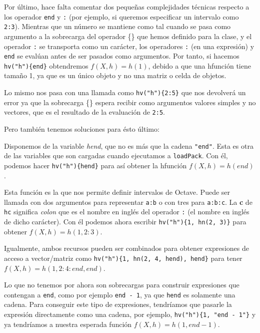 \documentclass{article}
\begin{document}
Por último, hace falta comentar dos pequeñas complejidades técnicas
respecto a los operador \texttt{end} y \texttt{:} (por ejemplo, si
queremos especificar un intervalo como \texttt{2:3}). Mientras que un
número se mantiene como tal cuando se pasa como argumento a la
sobrecarga del operador \{\} que hemos definido para la clase, y el
operador \texttt{:} se transporta como un carácter, los operadores
\texttt{:} (en una expresión) y \texttt{end} se evalúan antes de ser
pasados como argumentos. Por tanto, si hacemos \texttt{hv("h")\{end\}}
obtendremos $f(X, h) = h(1)$, debido a que una hfunción tiene tamaño
1, ya que es un único objeto y no una matriz o celda de objetos.

Lo mismo nos pasa con una llamada como \texttt{hv("h")\{2:5\}} que nos
devolverá un error ya que la sobrecarga \{\} espera recibir como
argumentos valores simples y no vectores, que es el resultado de la
evaluación de \texttt{2:5}.

Pero también tenemos soluciones para ésto último:

\begin{description}[font=\normalfont\ttfamily]
  \item[\texttt{end}] Disponemos de la variable \textit{hend}, que no
    es más que la cadena \texttt{"{}end"}. Esta es otra de las variables
    que son cargadas cuando ejecutamos a \texttt{loadPack}. Con él,
    podemos hacer \texttt{hv("h")\{hend\}} para así obtener la
    hfunción $f(X, h) = h(end)$.
  \item[\texttt{hc(a, b, [c])}] Esta función es la que nos permite
    definir intervalos de Octave. Puede ser llamada con dos argumentos
    para representar \texttt{a:b} o con tres para \texttt{a:b:c}. La
    \textbf{c} de \texttt{hc} significa \textit{colon} que es el
    nombre en inglés del operador \texttt{:} (el nombre en inglés de
    dicho carácter). Con él podemos ahora escribir \texttt{hv("h")\{1,
      hn(2, 3)\}} para obtener $f(X, h) = h(1, 2:3)$.
\end{description}

Igualmente, ambos recursos pueden ser combinados para obtener
expresiones de acceso a vector/matriz como \texttt{hv("h")\{1, hn(2,
  4, hend), hend\}} para tener $f(X, h) = h(1, 2:4:end, end)$.

Lo que no tenemos por ahora son sobrecargas para construir expresiones
que contengan a \texttt{end}, como por ejemplo \texttt{end - 1}, ya
que \texttt{hend} es solamente una cadena. Para conseguir este tipo de
expresiones, tendríamos que pasarle la expresión directamente como una
cadena, por ejemplo, \texttt{hv("h")\{1, "{}end - 1"\}} y ya tendríamos
a nuestra esperada función $f(X, h) = h(1, end - 1)$.
\end{document}
